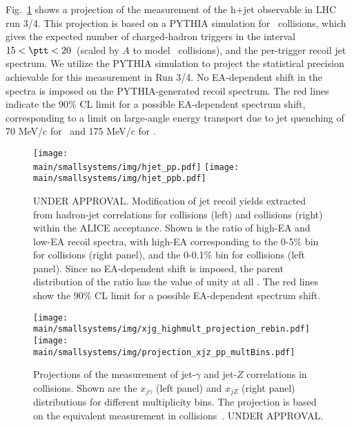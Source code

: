 \documentclass[../report.tex]{subfiles}
\providecommand{\main}{..}
\begin{document}
Fig.~\ref{fig:smallsystems_energyloss_hjet} shows a projection of the measurement of the h+jet observable in LHC run 3/4.
This projection is based on a PYTHIA simulation for \pp\ collisions, which gives the expected number of charged-hadron triggers in the interval $15<\ptt<20$~\UGeV (scaled by $A$ to model \pPb\ collisions), and the per-trigger recoil jet spectrum. 
We utilize the PYTHIA simulation to project the statistical precision achievable for this measurement in Run 3/4. No EA-dependent shift in the spectra is imposed on the PYTHIA-generated recoil spectrum. %
The red lines indicate the 90\% CL limit for a possible EA-dependent spectrum shift, corresponding to a limit on large-angle energy transport due to jet quenching of 70 MeV/c for \pPb\ and 175 MeV/c for \pp. 

\begin{figure}[ht]
\centering
\texttt{[image: \\main/smallsystems/img/hjet\_pp.pdf]}
\hfill
\texttt{[image: \\main/smallsystems/img/hjet\_ppb.pdf]}
\caption{UNDER APPROVAL. Modification of jet recoil yields extracted from hadron-jet correlations for \pp{} collisions (left) and \pPb collisions (right) within the ALICE acceptance. Shown is the ratio  of high-EA and low-EA recoil spectra, with high-EA corresponding to the 0-5\% bin for \pPb collisions (right panel), and the 0-0.1\% bin for \pp collisions (left panel). Since no EA-dependent shift is imposed, the parent distribution of the ratio has the value of unity at all \pT. The red lines show the 90\% CL limit for a possible EA-dependent spectrum shift.}
\label{fig:smallsystems_energyloss_hjet}
\end{figure}

\begin{figure}[ht]
\centering
\texttt{[image: \\main/smallsystems/img/xjg\_highmult\_projection\_rebin.pdf]}
\hfill
\texttt{[image: \\main/smallsystems/img/projection\_xjz\_pp\_multBins.pdf]}
\caption{Projections of the measurement of jet-$\gamma$ and jet-$Z$ correlations in \pp collisions. Shown are the $x_{j\gamma}$ (left panel) and $x_{jZ}$ (right panel) distributions for different multiplicity bins. The projection is based on the equivalent measurement in \pPb collisions~\cite{}. UNDER APPROVAL.} 
\label{fig:smallsystems_energyloss_xjg}
\end{figure}
\end{document}
